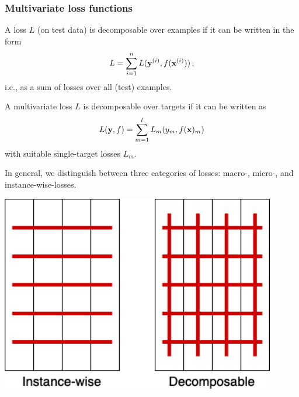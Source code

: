 \documentclass[11pt,compress,t,notes=noshow, xcolor=table]{beamer}
\begin{document}
\begin{frame}
	\frametitle{Multivariate loss functions}
	\small
	\begin{itemize}
%		
%
		\item A loss $L$ (on test data) is decomposable over examples if it can be written in the form
		$$
		L = \sum_{i=1}^n L(\mathbf{y}^{(i)}, f(\mathbf{x}^{(i)})) 
		\, ,
		$$
		i.e., as a sum of losses over all (test) examples. 
		
		
		\item A multivariate loss $L$ is decomposable over targets if it can be written as
		$$
		L(\mathbf{y}, f) = \sum_{m=1}^l L_m(y_m, f(\mathbf{x})_m) 
		$$
		with suitable single-target losses $L_m$. 
		
%		

		\begin{minipage}{0.45\textwidth}
%			
			\item  In general, we distinguish between three categories of losses: macro-, micro-, and instance-wise-losses. 
%			
		\end{minipage}
%	
		\begin{minipage}{0.45\textwidth}
			\begin{center}
				\includegraphics[width=0.9\textwidth]{figure/fmeasure}
			\end{center}
		\end{minipage}
%		
	\end{itemize}
%
\end{frame}
\end{document}

